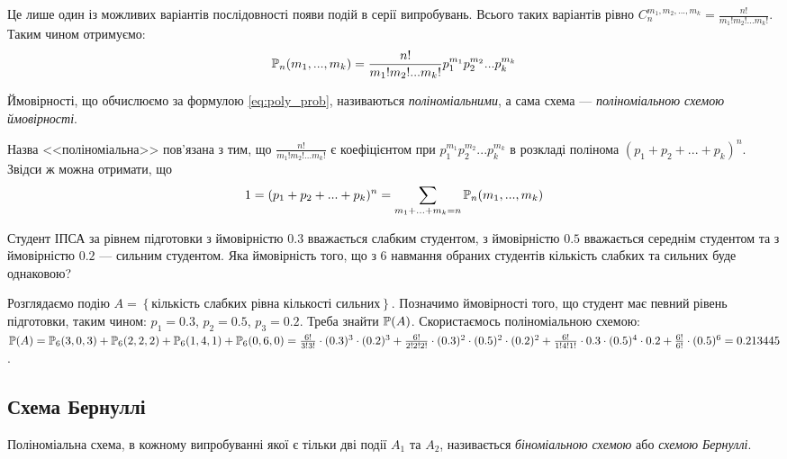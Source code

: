 Це лише один із можливих варіантів послідовності появи подій в серії випробувань. Всього таких варіантів 
рівно $C_n^{m_1, m_2, ..., m_k} = \frac{n!}{m_1!m_2! ... m_k!}$. Таким чином отримуємо:
\begin{equation}\label{eq:poly_prob}
    \P_n(m_1, ..., m_k) = \frac{n!}{m_1!m_2! ... m_k!} p_1^{m_1} p_2^{m_2} ... p_k^{m_k}
\end{equation}
\begin{definition}
    Ймовірності, що обчислюємо за формулою \eqref{eq:poly_prob}, називаються \emph{поліноміальними}, а 
    сама схема --- \emph{поліноміальною схемою ймовірності}. 
\end{definition}
\begin{remark} Назва <<поліноміальна>> пов'язана з тим, що $\frac{n!}{m_1!m_2! ... m_k!}$
    є коефіцієнтом при $p_1^{m_1} p_2^{m_2} ... p_k^{m_k}$ в розкладі полінома $(p_1 + p_2 + ... + p_k)^n$.
    Звідси ж можна отримати, що
    $$1 = (p_1 + p_2 + ... + p_k)^n = \sum\limits_{m_1 + ... + m_k = n} \P_n(m_1, ..., m_k)$$
\end{remark}
\begin{example}
    Студент ІПСА за рівнем підготовки з ймовірністю $0.3$ вважається слабким студентом, 
    з ймовірністю $0.5$ вважається середнім студентом та 
    з ймовірністю $0.2$ --- сильним студентом. Яка ймовірність того, що з 6 навмання 
    обраних студентів кількість слабких та сильних буде однаковою?

    Розглядаємо подію $A = \left\{\text{кількість слабких рівна кількості сильних}\right\}$. 
    Позначимо ймовірності того, що студент має певний рівень підготовки, таким чином:
    $p_1 = 0.3$, $p_2 = 0.5$, $p_3 = 0.2$.
    Треба знайти $\P(A)$.
    Скористаємось поліноміальною схемою:
    $\P(A) = \P_6(3, 0, 3) + \P_6(2, 2, 2) + \P_6(1, 4, 1) + \P_6(0, 6, 0) = 
    \frac{6!}{3!3!}\cdot(0.3)^3 \cdot(0.2)^3 + \frac{6!}{2!2!2!}\cdot(0.3)^2 \cdot(0.5)^2 \cdot(0.2)^2 + 
    \frac{6!}{1!4!1!}\cdot0.3 \cdot(0.5)^4 \cdot 0.2 + \frac{6!}{6!} \cdot(0.5)^6 = 0.213445$.
\end{example}
\subsection{Схема Бернуллі}
\begin{definition}
    Поліноміальна схема, в кожному випробуванні якої є тільки дві події $A_1$ та $A_2$, 
    називається \emph{біноміальною схемою} або \emph{схемою Бернуллі}.
\end{definition}


